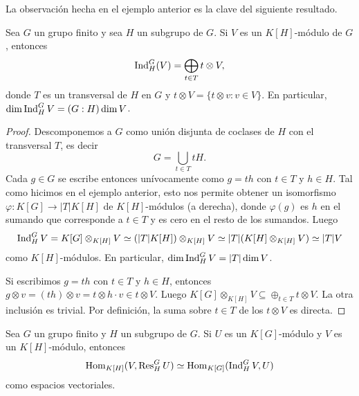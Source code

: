 La observación hecha en el ejemplo anterior es la clave del siguiente resultado.

\begin{proposition}
Sea $G$ un grupo finito y sea 
$H$ un subgrupo de $G$. Si $V$ es un $K[H]$-módulo de $G$, entonces 
\[
    \operatorname{Ind}_H^G(V)=\bigoplus_{t\in T}t\otimes V,
\]
donde $T$ es un transversal de $H$ en $G$ y $t\otimes V=\{t\otimes v:v\in V\}$. En particular, 
$\dim\operatorname{Ind}_H^GV=(G:H)\dim V$.
\end{proposition}

\begin{proof}
Descomponemos a $G$ como unión disjunta de coclases de $H$ con el transversal $T$, es decir
\[
G=\bigcup_{t\in T}tH.
\]
Cada $g\in G$ se escribe entonces unívocamente como $g=th$ con $t\in T$ y $h\in H$. Tal como 
hicimos en el ejemplo anterior, esto nos permite obtener un isomorfismo 
$\varphi\colon K[G]\to |T|K[H]$ de $K[H]$-módulos (a derecha), donde $\varphi(g)$ es $h$ en el sumando que corresponde a $t\in T$
y es cero en el resto de los sumandos. Luego
\[
\operatorname{Ind}_H^GV=K[G]\otimes_{K[H]}V\simeq (|T|K[H])\otimes_{K[H]}V\simeq |T|(K[H]\otimes_{K[H]}V)\simeq |T|V
\]
como $K[H]$-módulos. En particular, $\dim\operatorname{Ind}_H^GV=|T|\dim V$. 

Si escribimos $g=th$ con $t\in T$ y $h\in H$, entonces $g\otimes v=(th)\otimes v=t\otimes h\cdot v\in t\otimes V$. 
Luego $K[G]\otimes_{K[H]}V\subseteq \oplus_{t\in T}t\otimes V$. La otra inclusión es trivial. Por definición, 
la suma sobre $t\in T$ de los $t\otimes V$ es directa. 
\end{proof}

\begin{theorem}
Sea $G$ un grupo finito y $H$ un subgrupo de $G$. 
Si $U$ es un $K[G]$-módulo y $V$ es un $K[H]$-módulo, entonces
\[
\operatorname{Hom}_{K[H]}(V,\operatorname{Res}_H^GU)\simeq \operatorname{Hom}_{K[G]}(\operatorname{Ind}_H^GV,U)
\]
como espacios vectoriales.
\end{theorem}

